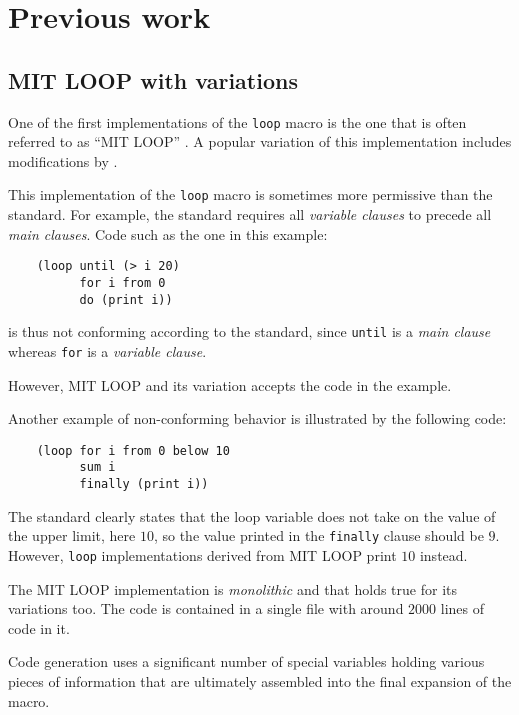 \section{Previous work}

\subsection{MIT LOOP with variations}
\label{sec-mit-loop}

One of the first implementations of the \commonlisp{} \texttt{loop}
macro is the one that is often referred to as ``MIT LOOP''
\cite{Burke:Moon:MIT.loop}.  A popular variation of this
implementation includes modifications by \symbolics{}.

This implementation of the \texttt{loop} macro is sometimes more
permissive than the \commonlisp{} standard.  For example, the standard
requires all \emph{variable clauses} to precede all \emph{main
  clauses}.  Code such as the one in this example:

\begin{verbatim}
    (loop until (> i 20)
          for i from 0
          do (print i))
\end{verbatim}

\noindent
is thus not conforming according to the standard, since \texttt{until}
is a \emph{main clause} whereas \texttt{for} is a \emph{variable
  clause}.

However, MIT LOOP and its variation accepts the code in the example.

Another example of non-conforming behavior is illustrated by the
following code:

\begin{verbatim}
    (loop for i from 0 below 10
          sum i
          finally (print i))
\end{verbatim}

The \commonlisp{} standard clearly states that the loop variable does
not take on the value of the upper limit, here $10$, so the value
printed in the \texttt{finally} clause should be $9$.  However,
\texttt{loop} implementations derived from MIT LOOP print $10$
instead.

The MIT LOOP implementation is \emph{monolithic} and that holds true
for its variations too.  The code is contained in a single file with
around $2000$ lines of code in it.

Code generation uses a significant number of special variables holding
various pieces of information that are ultimately assembled into the
final expansion of the macro.

